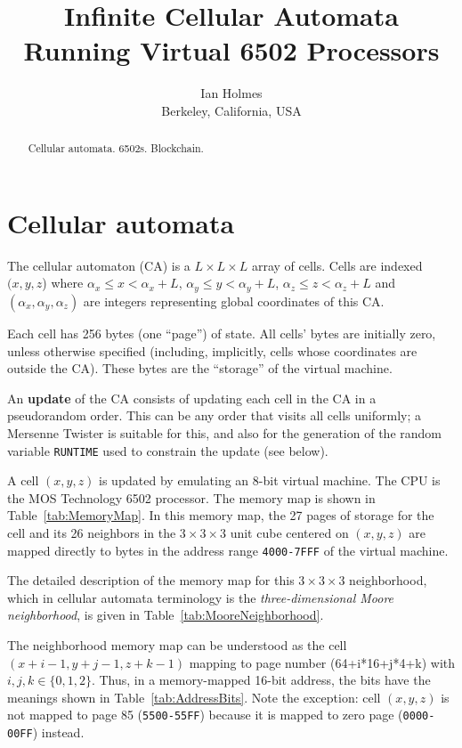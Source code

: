 \documentclass{article}
\newcommand\hex[1]{{\tt #1}}
\newcommand\hexrange[2]{\hex{#1}{\tt -}\hex{#2}}
\begin{document}
\title{Infinite Cellular Automata Running Virtual 6502 Processors}
\author{Ian Holmes \\ Berkeley, California, USA}

\maketitle


\begin{abstract}
  Cellular automata.
  6502s.
  Blockchain.
\end{abstract}

\section{Cellular automata}

The cellular automaton (CA) is a $L \times L \times L$ array of cells.
Cells are indexed $(x,y,z$) where
$\alpha_x \leq x < \alpha_x+L$,
$\alpha_y \leq y < \alpha_y+L$,
$\alpha_z \leq z < \alpha_z+L$
and $(\alpha_x,\alpha_y,\alpha_z)$ are integers representing global coordinates of this CA.

Each cell has 256 bytes (one ``page'') of state.
All cells' bytes are initially zero, unless otherwise specified
(including, implicitly, cells whose coordinates are outside the CA).
These bytes are the ``storage'' of the virtual machine.

An {\bf update} of the CA consists of updating each cell in the CA in a pseudorandom order.
This can be any order that visits all cells uniformly;
a Mersenne Twister is suitable for this,
and also for the generation of the random variable {\tt RUNTIME} used to constrain the update (see below).

A cell $(x,y,z)$ is updated by emulating an 8-bit virtual machine.
The CPU is the MOS Technology 6502 processor.
The memory map is shown in Table~\ref{tab:MemoryMap}.
In this memory map, the 27 pages of storage
for the cell and its 26 neighbors
in the $3 \times 3 \times 3$ unit cube centered on $(x,y,z)$
are mapped directly to bytes in the address range \hexrange{4000}{7FFF} of the virtual machine.

The detailed description of the memory map for this $3 \times 3 \times 3$ neighborhood,
which in cellular automata terminology is
the {\em three-dimensional Moore neighborhood},
is given in Table~\ref{tab:MooreNeighborhood}.

The neighborhood memory map can be understood as the cell $(x+i-1,y+j-1,z+k-1)$
mapping to page number (64+i*16+j*4+k) with $i,j,k \in \{0,1,2\}$.
Thus, in a memory-mapped 16-bit address, the bits have the meanings shown in Table~\ref{tab:AddressBits}.
Note the exception: cell $(x,y,z)$ is not mapped to page 85 (\hexrange{5500}{55FF})
because it is mapped to zero page (\hexrange{0000}{00FF}) instead.
\end{document}
